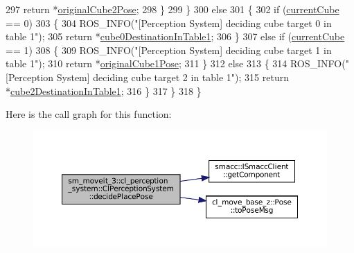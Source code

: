 \begin{DoxyCode}
297         \textcolor{keywordflow}{return} *\hyperlink{classsm__moveit__3_1_1cl__perception__system_1_1ClPerceptionSystem_a71df0282435faa5f108c4fb2d846e90f}{originalCube2Pose};
298       \}
299     \}
300     \textcolor{keywordflow}{else}
301     \{
302       \textcolor{keywordflow}{if} (\hyperlink{classsm__moveit__3_1_1cl__perception__system_1_1ClPerceptionSystem_ad915fc687481d4157ec40de52f8eaa82}{currentCube} == 0)
303       \{
304         ROS\_INFO(\textcolor{stringliteral}{"[Perception System] deciding cube target 0 in table 1"});
305         \textcolor{keywordflow}{return} *\hyperlink{classsm__moveit__3_1_1cl__perception__system_1_1ClPerceptionSystem_a56f5be6a474c2825b99cab724d2099a1}{cube0DestinationInTable1};
306       \}
307       \textcolor{keywordflow}{else} \textcolor{keywordflow}{if} (\hyperlink{classsm__moveit__3_1_1cl__perception__system_1_1ClPerceptionSystem_ad915fc687481d4157ec40de52f8eaa82}{currentCube} == 1)
308       \{
309         ROS\_INFO(\textcolor{stringliteral}{"[Perception System] deciding cube target 1 in table 1"});
310         \textcolor{keywordflow}{return} *\hyperlink{classsm__moveit__3_1_1cl__perception__system_1_1ClPerceptionSystem_aaf71c0201292be01979762e7f893878d}{originalCube1Pose};
311       \}
312       \textcolor{keywordflow}{else}
313       \{
314         ROS\_INFO(\textcolor{stringliteral}{"[Perception System] deciding cube target 2 in table 1"});
315         \textcolor{keywordflow}{return} *\hyperlink{classsm__moveit__3_1_1cl__perception__system_1_1ClPerceptionSystem_a1aae7fcf13de6c6b6c07dd2b595a5538}{cube2DestinationInTable1};
316       \}
317     \}
318   \}
\end{DoxyCode}
Here is the call graph for this function\+:
\nopagebreak
\begin{figure}[H]
\begin{center}
\leavevmode
\includegraphics[width=350pt]{classsm__moveit__3_1_1cl__perception__system_1_1ClPerceptionSystem_a0ee47269c0aacdced77b9bbe9577499d_cgraph}
\end{center}
\end{figure}
\mbox{\label{classsm__moveit__3_1_1cl__perception__system_1_1ClPerceptionSystem_a6abfb0c37f72ea92986d3d007f668dbb}} 
